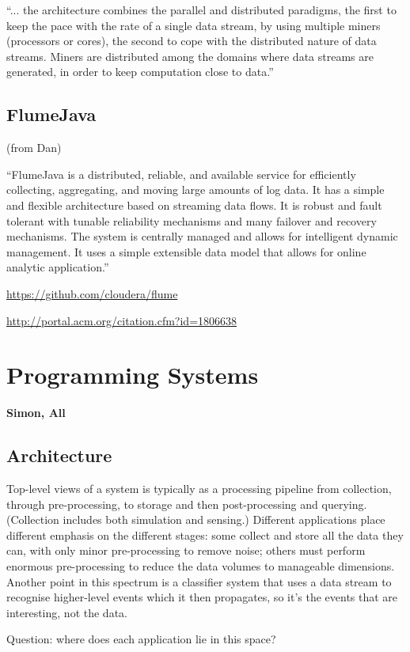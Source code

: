 \documentclass[preprint,12pt]{article}
\begin{document}
``... the architecture combines the parallel and distributed
paradigms, the first to keep the pace with the rate of a
single data stream, by using multiple miners (processors
or cores), the second to cope with the distributed
nature of data streams. Miners are distributed among
the domains where data streams are generated, in order
to keep computation close to data.''

\subsection{FlumeJava} (from Dan)

``FlumeJava is a distributed, reliable, and available service for
efficiently collecting, aggregating, and moving large amounts of log
data. It has a simple and flexible architecture based on streaming
data flows. It is robust and fault tolerant with tunable reliability
mechanisms and many failover and recovery mechanisms. The system is
centrally managed and allows for intelligent dynamic management. It
uses a simple extensible data model that allows for online analytic
application.''

\url{https://github.com/cloudera/flume}

\url{http://portal.acm.org/citation.cfm?id=1806638}


\section{Programming Systems} {\bf Simon, All}

\subsection{Architecture}

Top-level views of a system is typically as a processing pipeline from
collection, through pre-processing, to storage and then
post-processing and querying. (Collection includes both simulation and
sensing.) Different applications place different emphasis on the
different stages: some collect and store all the data they can, with
only minor pre-processing to remove noise; others must perform
enormous pre-processing to reduce the data volumes to manageable
dimensions. Another point in this spectrum is a classifier system that
uses a data stream to recognise higher-level events which it then
propagates, so it's the events that are interesting, not the data.

Question: where does each application lie in this space?
\end{document}
